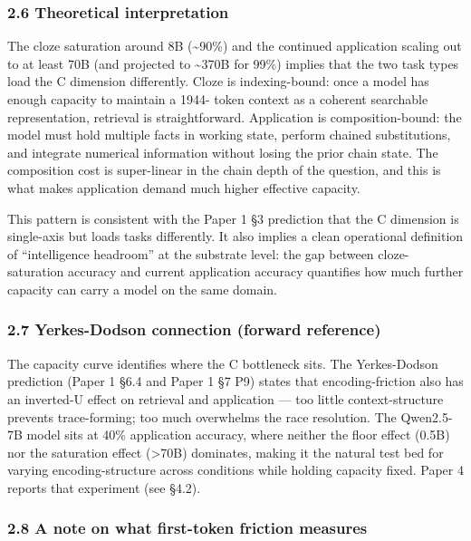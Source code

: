 \documentclass[
]{article}
\begin{document}
\subsubsection{2.6 Theoretical
interpretation}\label{theoretical-interpretation}

The cloze saturation around 8B (\textasciitilde90\%) and the continued
application scaling out to at least 70B (and projected to
\textasciitilde370B for 99\%) implies that the two task types load the C
dimension differently. Cloze is indexing-bound: once a model has enough
capacity to maintain a 1944- token context as a coherent searchable
representation, retrieval is straightforward. Application is
composition-bound: the model must hold multiple facts in working state,
perform chained substitutions, and integrate numerical information
without losing the prior chain state. The composition cost is
super-linear in the chain depth of the question, and this is what makes
application demand much higher effective capacity.

This pattern is consistent with the Paper 1 §3 prediction that the C
dimension is single-axis but loads tasks differently. It also implies a
clean operational definition of ``intelligence headroom'' at the
substrate level: the gap between cloze-saturation accuracy and current
application accuracy quantifies how much further capacity can carry a
model on the same domain.

\subsubsection{2.7 Yerkes-Dodson connection (forward
reference)}\label{yerkes-dodson-connection-forward-reference}

The capacity curve identifies where the C bottleneck sits. The
Yerkes-Dodson prediction (Paper 1 §6.4 and Paper 1 §7 P9) states that
encoding-friction also has an inverted-U effect on retrieval and
application --- too little context-structure prevents trace-forming; too
much overwhelms the race resolution. The Qwen2.5-7B model sits at 40\%
application accuracy, where neither the floor effect (0.5B) nor the
saturation effect (\textgreater70B) dominates, making it the natural
test bed for varying encoding-structure across conditions while holding
capacity fixed. Paper 4 reports that experiment (see §4.2).

\subsubsection{2.8 A note on what first-token friction
measures}\label{a-note-on-what-first-token-friction-measures}
\end{document}
